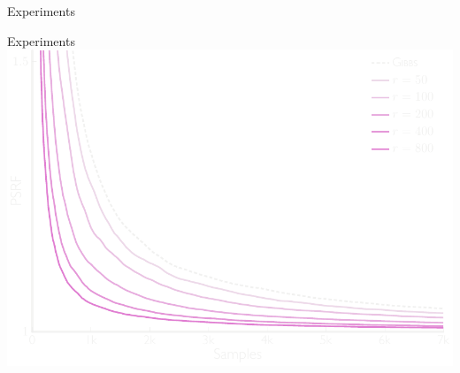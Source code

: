\documentclass[mathserif]{beamer}
\begin{document}
\begin{frame}{Experiments}
\vspace{1em}
\centering
{}%
\end{frame}


\begin{frame}{Experiments}
\vspace{1em}
\centering
\includegraphics[width=\textwidth,trim=0 0 0 0,clip]{figures/exp2.pdf}
\end{frame}
\end{document}
